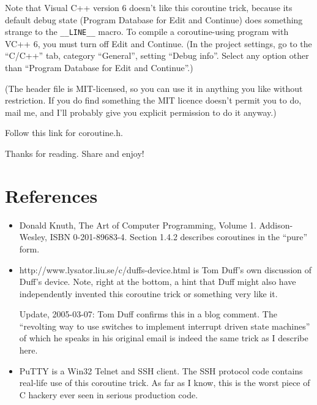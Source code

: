 \documentclass[12pt]{article}
\begin{document}
\begin{CJK}{UTF8}{bsmi}
Note that Visual C++ version 6 doesn't like this coroutine trick, because its default debug state (Program Database for Edit and Continue) does something strange to the
\verb+__LINE__+ macro. To compile a coroutine-using program with VC++ 6, you must turn off Edit and Continue. (In the project settings, go to the ``C/C++'' tab, category ``General'', setting ``Debug info''. Select any option other than ``Program Database for Edit and Continue''.)

(The header file is MIT-licensed, so you can use it in anything you like without restriction. If you do find something the MIT licence doesn't permit you to do, mail me, and I'll probably give you explicit permission to do it anyway.)

Follow this link for coroutine.h.

%


Thanks for reading. Share and enjoy!

\section{References}

\begin{itemize}
\item Donald Knuth, The Art of Computer Programming, Volume 1. Addison-Wesley, ISBN 0-201-89683-4. Section 1.4.2 describes coroutines in the ``pure'' form.

\item http://www.lysator.liu.se/c/duffs-device.html is Tom Duff's own discussion of Duff's device. Note, right at the bottom, a hint that Duff might also have independently invented this coroutine trick or something very like it.


Update, 2005-03-07: Tom Duff confirms this in a blog comment. The ``revolting way to use switches to implement interrupt driven state machines'' of which he speaks in his original email is indeed the same trick as I describe here.

\item PuTTY is a Win32 Telnet and SSH client. The SSH protocol code contains real-life use of this coroutine trick. As far as I know, this is the worst piece of C hackery ever seen in serious production code. 

\end{itemize}


\end{CJK}
\end{document}
